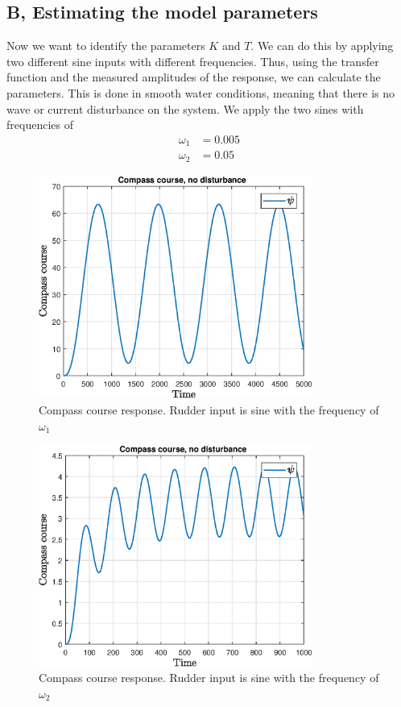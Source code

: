 \subsection{B, Estimating the model parameters}
Now we want to identify the parameters $K$ and $T$.
We can do this by applying two different sine inputs with different frequencies. Thus, using the transfer function and the measured amplitudes of the response, we can calculate the parameters. This is done in smooth water conditions, meaning that there is no wave or current disturbance on the system. 
We apply the two sines with frequencies of 
\begin{align*}
    \omega_1 &= 0.005\\
    \omega_2 &= 0.05
\end{align*}
\begin{figure}
    \centering
    \includegraphics[width = 0.8\textwidth]{figures/plots/P5p1b_heading_005.eps}
    \caption{Compass course response. Rudder input is sine with the frequency of $\omega_1$}
    \label{fig:p1pb_heading_005}
\end{figure}
\begin{figure}
    \centering
    \includegraphics[width = 0.8\textwidth]{figures/plots/P5p1b_heading_05.eps}
    \caption{Compass course response. Rudder input is sine with the frequency of $\omega_2$}
    \label{fig:p1pb_heading_05}
\end{figure}
